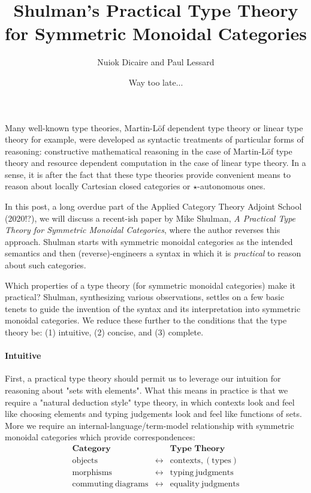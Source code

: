 \documentclass[pra,floatfix,
amsmath,superscriptaddress, 12pt]{article}
\title{Shulman's Practical Type Theory for Symmetric Monoidal Categories}
\author{Nuiok Dicaire and Paul Lessard}
\date{Way too late...}
\theoremstyle{definition}
\begin{document}
\maketitle







Many well-known type theories, Martin-L\"{o}f dependent type theory or linear type theory for example, were developed as syntactic treatments of particular forms of reasoning: constructive mathematical reasoning in the case of Martin-L\"{o}f type theory and resource dependent computation in the case of linear type theory. In a sense, it is after the fact that these type theories provide convenient means to reason about locally Cartesian closed categories or $\star$-autonomous ones.

In this post, a long overdue part of the Applied Category Theory Adjoint School (2020!?), we will discuss a recent-ish paper by Mike Shulman, 
\textit{A Practical Type Theory for Symmetric Monoidal Categories}, where the author reverses this approach. 
Shulman starts with symmetric monoidal categories as the intended semantics and then (reverse)-engineers a syntax in which it is \emph{practical} to reason about such categories.

\hrulefill

Which properties of a type theory (for symmetric monoidal categories) make it practical? Shulman, synthesizing various observations, settles on a few basic tenets to guide the invention of the syntax and its interpretation into symmetric monoidal categories. We reduce these further to the conditions that the type theory be: (1) intuitive, (2) concise, and (3) complete.

\paragraph{Intuitive} First, a practical type theory should permit us to leverage our intuition for reasoning about "sets with elements". What this means in practice is that we require a "natural deduction style" type theory, in which contexts look and feel like choosing elements and typing judgements look and feel like functions of sets. More we require an internal-language/term-model relationship with symmetric monoidal categories which provide correspondences:
\begin{eqnarray*}
\textbf{Category}              &  & \textbf{Type Theory}\\
\mathrm{objects}                & \longleftrightarrow & \mathrm{contexts, (types)}\\
\mathrm{morphisms}              & \longleftrightarrow & \mathrm{typing\ judgments}\\
\mathrm{commuting\ diagrams}     & \longleftrightarrow & \mathrm{equality\ judgments}
\end{eqnarray*}
\end{document}
